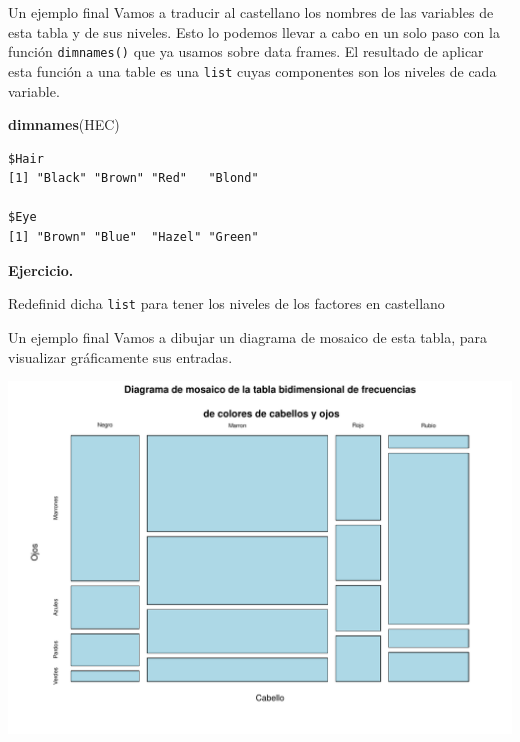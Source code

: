 \documentclass[
  ignorenonframetext,
]{beamer}
\newenvironment{Shaded}{\begin{snugshade}}{\end{snugshade}}
\newcommand{\FunctionTok}[1]{\textcolor[rgb]{0.13,0.29,0.53}{\textbf{#1}}}
\newcommand{\NormalTok}[1]{#1}
\begin{document}
\begin{frame}[fragile]{Un ejemplo final}
\label{un-ejemplo-final-1}
Vamos a traducir al castellano los nombres de las variables de esta
tabla y de sus niveles. Esto lo podemos llevar a cabo en un solo paso
con la función \texttt{dimnames()} que ya usamos sobre data frames. El
resultado de aplicar esta función a una table es una \texttt{list} cuyas
componentes son los niveles de cada variable.

\begin{Shaded}
\begin{Highlighting}[]
\FunctionTok{dimnames}\NormalTok{(HEC)}
\end{Highlighting}
\end{Shaded}

\begin{verbatim}
$Hair
[1] "Black" "Brown" "Red"   "Blond"

$Eye
[1] "Brown" "Blue"  "Hazel" "Green"
\end{verbatim}

\textbf{Ejercicio.}

Redefinid dicha \texttt{list} para tener los niveles de los factores en
castellano
\end{frame}

\begin{frame}{Un ejemplo final}
\label{un-ejemplo-final-2}
Vamos a dibujar un diagrama de mosaico de esta tabla, para visualizar
gráficamente sus entradas.

\includegraphics{R_base_files/figure-beamer/unnamed-chunk-101-1.pdf}
\end{frame}
\end{document}
